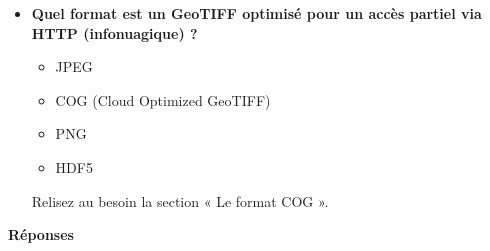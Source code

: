 \documentclass[
  french,
  11pt,
  letterpaper,
  open=any,
  twoside=false,
  french]{scrbook}
\providecommand{\tightlist}{%
  \setlength{\itemsep}{0pt}\setlength{\parskip}{0pt}}
\begin{document}
\begin{itemize}
  Relisez au besoin la section « Données en géoscience ».
\item
  \textbf{Quel format est un GeoTIFF optimisé pour un accès partiel via
  HTTP (infonuagique) ?}

  \begin{itemize}
  \tightlist
  \item
    JPEG
  \item
    COG (Cloud Optimized GeoTIFF)
  \item
    PNG
  \item
    HDF5
  \end{itemize}

  Relisez au besoin la section « Le format COG ».
\end{itemize}

\textbf{Réponses}
\end{document}
